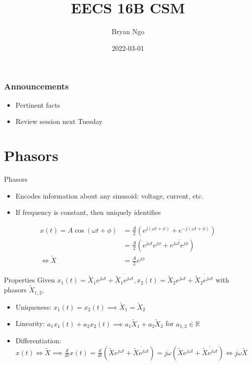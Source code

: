 \documentclass[aspectratio=169]{beamer}
\title{EECS 16B CSM}
\author{Bryan Ngo}
\date{2022-03-01}
\institute{UC Berkeley}
\begin{document}
\begin{frame}
    \maketitle
\end{frame}

\begin{frame}
    \frametitle{Announcements}

    \begin{itemize}
        \item Pertinent facts
        \item Review session next Tuesday
    \end{itemize}
\end{frame}

\section{Phasors}

\begin{frame}{Phasors}
    \begin{itemize}
        \item Encodes information about any sinusoid: voltage, current, etc.
        \item If frequency is constant, then uniquely identifies
    \end{itemize}
    \begin{align}
        x(t) = A \cos(\omega t + \phi) &= \frac{A}{2} \left(e^{j (\omega t + \phi)} + e^{-j (\omega t + \phi)}\right) \\
        &= \frac{A}{2} \left(e^{j \omega t} e^{j \phi} + \overline{e^{j \omega t} e^{j \phi}}\right) \\
        \iff \widetilde{X} &= \frac{A}{2} e^{j \phi}
    \end{align}
\end{frame}

\begin{frame}{Properties}
    Given \(x_1(t) = \widetilde{X}_1 e^{j \omega t} + \overline{\widetilde{X}_1 e^{j \omega t}}, x_2(t) = \widetilde{X}_2 e^{j \omega t} + \overline{\widetilde{X}_2 e^{j \omega t}}\) with phasors \(\widetilde{X}_{1, 2}\),
    \begin{itemize}
        \item Uniqueness: \(x_1(t) = x_2(t) \implies \widetilde{X}_1 = \widetilde{X}_2\)
        \item Linearity: \(a_1 x_1(t) + a_2 x_2(t) \implies a_1 \widetilde{X}_1 + a_2 \widetilde{X}_2\) for \(a_{1, 2} \in \mathbb{R}\)
        \item Differentiation: \(x(t) \iff \widetilde{X} \implies \frac{d}{dt} x(t) = \frac{d}{dt} \left(\widetilde{X} e^{j \omega t} + \overline{\widetilde{X} e^{j \omega t}}\right) = j \omega \left(\widetilde{X} e^{j \omega t} + \overline{\widetilde{X} e^{j \omega t}}\right) \iff j \omega \widetilde{X}\)
    \end{itemize}
\end{frame}
\end{document}
